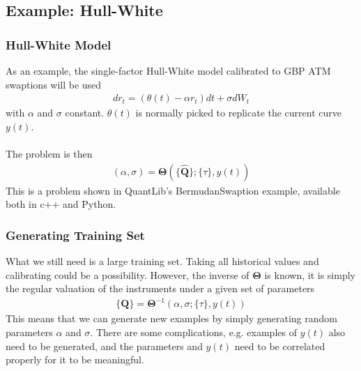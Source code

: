 \documentclass[bigger]{beamer}
\begin{document}
\subsection{Example: Hull-White}
\begin{frame}
\frametitle{Hull-White Model} 
  \justifying
As an example, the single-factor Hull-White model calibrated to GBP ATM swaptions will be used
\begin{align*}
dr_t = (\theta(t) - \alpha r_t)dt + \sigma dW_t
\end{align*}
with $\alpha$ and $\sigma$ constant. $\theta(t)$ is normally picked to replicate the current curve $y(t)$. 
\\~\\
The problem is then
\begin{align*}
(\alpha, \sigma) = \bm{\Theta}\left(\lbrace \hat{\mathbf{Q}} \rbrace; \lbrace \tau \rbrace, y(t) \right)
\end{align*}
This is a problem shown in QuantLib's BermudanSwaption example, available both in c++ and Python.
\end{frame}
%
%

\begin{frame}
\frametitle{Generating Training Set}
  \justifying
What we still need is a large training set. Taking all historical values and calibrating could be a possibility. However, the inverse of $\bm{\Theta}$ is known, it is simply the regular valuation of the instruments under a given set of parameters
\begin{align*}
\lbrace \mathbf{Q} \rbrace = \bm{\Theta}^{-1}\left(\alpha, \sigma; \lbrace \tau \rbrace, y(t) \right)
\end{align*}
This means that we can generate new examples by simply generating random parameters $\alpha$ and $\sigma$. There are some complications, e.g. examples of $y(t)$ also need to be generated, and the parameters and $y(t)$ need to be correlated properly for it to be meaningful. 
\end{frame}
\end{document}
